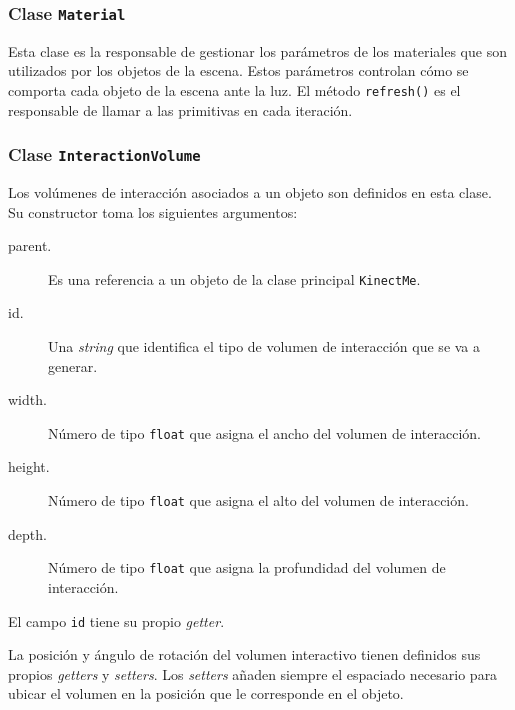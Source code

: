 \documentclass[10pt,a4paper]{report}
\begin{document}
	\subsubsection{Clase \texttt{Material}}
	Esta clase es la responsable de gestionar los parámetros de los materiales que son utilizados por los objetos de la escena. Estos parámetros controlan cómo se comporta cada objeto de la escena ante la luz. El método \texttt{refresh()} es el responsable de llamar a las primitivas en cada iteración.
	
	
	
	\subsubsection{Clase \texttt{InteractionVolume}}
	Los volúmenes de interacción asociados a un objeto son definidos en esta clase. Su constructor toma los siguientes argumentos:
	\begin{description}
	\item[parent.] Es una referencia a un objeto de la clase principal \texttt{KinectMe}.
	\item[id.] Una \textit{string} que identifica el tipo de volumen de interacción que se va a generar.
	\item[width.] Número de tipo \texttt{float} que asigna el ancho del volumen de interacción.
	\item[height.] Número de tipo \texttt{float} que asigna el alto del volumen de interacción.
	\item[depth.] Número de tipo \texttt{float} que asigna la profundidad del volumen de interacción.
	\end{description}
	
	
	
	El campo \texttt{id} tiene su propio \textit{getter}.
	
	
	
	La posición y ángulo de rotación del volumen interactivo tienen definidos sus propios \textit{getters} y \textit{setters}. Los \textit{setters} añaden siempre el espaciado necesario para ubicar el volumen en la posición que le corresponde en el objeto.
	
	
	
\end{document}
